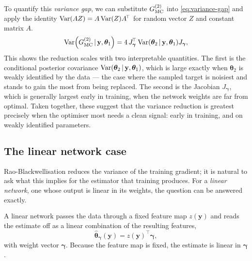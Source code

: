 To quantify this \emph{variance gap}, we can substitute $G_{\mathrm{MC}}^{(2)}$ into \eqref{eq:variance-gap} and apply the identity $\operatorname{Var}(AZ) = A \operatorname{Var}(Z) A^{\!\top}$ for random vector $Z$ and constant matrix $A$.
%
\begin{equation}
\operatorname{Var}\!\left( G_{\mathrm{MC}}^{(2)} \,|\, \mathbf y,\bm{\theta}_1 \right) = 4\, J_{\bm{\gamma}}^{\!\top} \operatorname{Var}(\bm{\theta}_2\,|\, \mathbf y,\bm{\theta}_1) J_{\bm{\gamma}},
\label{eq:general-gradient-cov-gap}
\end{equation}
%
This shows the reduction scales with two interpretable quantities. The first is the conditional posterior covariance $\operatorname{Var}(\bm{\theta}_2\,|\, \mathbf y,\bm{\theta}_1)$, which is large exactly when $\bm{\theta}_2$ is weakly identified by the data --- the case where the sampled target is noisiest and stands to gain the most from being replaced. The second is the Jacobian $J_{\bm{\gamma}}$, which is generally largest early in training, when the network weights are far from optimal. Taken together, these suggest that the variance reduction is greatest precisely when the optimiser most needs a clean signal: early in training, and on weakly identified parameters.





\subsection{The linear network case}
\label{sec:linear-network}

Rao-Blackwellisation reduces the variance of the training gradient;
it is natural to ask what this implies for the estimator that
training produces. For a \emph{linear network}, one whose output is
linear in its weights, the question can be answered exactly.

A linear network passes the data through a fixed feature map
$z(\mathbf{y})$ and reads the estimate off as a linear combination of
the resulting features,
%
\begin{equation}
  \hat{\bm{\theta}}_{\bm{\gamma}}(\mathbf{y})
  = z(\mathbf{y})^{\!\top} \bm{\gamma},
  \label{eq:linear-net}
\end{equation}
%
with weight vector $\bm{\gamma}$. Because the feature map is fixed,
the estimate is linear in $\bm{\gamma}$.

